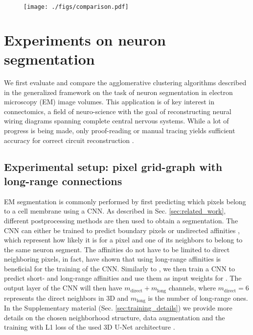 
\begin{figure}[t]
\centering
\texttt{[image: ./figs/comparison.pdf]} %
\caption{
\label{fig:cremi_comparison}}
\end{figure}

\section{Experiments on neuron segmentation}\label{sec:neuro_segm_exp}

We first evaluate and compare the agglomerative clustering algorithms described in the generalized framework on the task of neuron segmentation in electron microscopy (EM) image volumes. This application is of key interest in connectomics, a field of neuro-science with the goal of reconstructing neural wiring diagrams spanning complete central nervous systems. While a lot of progress is being made, only proof-reading or manual tracing yields sufficient accuracy for correct circuit reconstruction \cite{schlegel2017learning}.

\subsection{Experimental setup: pixel grid-graph with long-range connections} \label{sec:grid_graph}
EM segmentation is commonly performed by first predicting which pixels belong to a cell membrane using a CNN. As described in Sec. \ref{sec:related_work}, different postprocessing methods are then used to obtain a segmentation. The CNN can either be trained to predict boundary pixels \cite{beier2017multicut,ciresan2012deep} or undirected affinities \cite{wolf2018mutex,lee2017superhuman,funke2018large}, which represent how likely it is for a pixel and one of its neighbors to belong to the same neuron segment. The affinities do not have to be limited to direct neighboring pixels, in fact, \cite{lee2017superhuman} have shown that using long-range affinities is beneficial for the training of the CNN. Similarly to \cite{wolf2018mutex}, we then train a CNN to predict short- and long-range affinities and use them as input weights for \algname{}. The output layer of the CNN will then have $m_{\mathrm{direct}}+m_{\mathrm{long}}$ channels, where $m_{\mathrm{direct}}=6$ represents the direct neighbors in 3D and $m_{\mathrm{long}}$ is the number of long-range ones. In the Supplementary material (Sec. \ref{sec:training_details}) we provide more details on the chosen neighborhood structure, data augmentation and the training with L1 loss of the used 3D U-Net architecture \cite{ronneberger2015u,cciccek20163d}.

